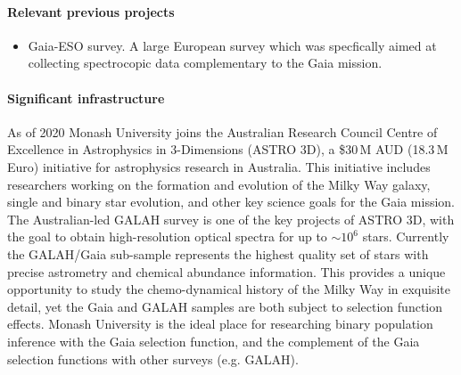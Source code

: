 \paragraph{Relevant previous projects}

\begin{itemize}
    \item Gaia-ESO survey. A large European survey which was specfically aimed at collecting spectrocopic data complementary to the Gaia mission.
\end{itemize}

\paragraph{Significant infrastructure}
As of 2020 Monash University joins the Australian Research Council Centre of Excellence in Astrophysics in 3-Dimensions (ASTRO 3D), a \$30\,M AUD (18.3\,M Euro) initiative for astrophysics research in Australia. This initiative includes researchers working on the formation and evolution of the Milky Way galaxy, single and binary star evolution, and other key science goals for the Gaia mission. The Australian-led GALAH survey is one of the key projects of ASTRO 3D, with the goal to obtain high-resolution optical spectra for up to $\sim10^6$ stars. Currently the GALAH/Gaia sub-sample represents the highest quality set of stars with precise astrometry and chemical abundance information. This provides a unique opportunity to study the chemo-dynamical history of the Milky Way in exquisite detail, yet the Gaia and GALAH samples are both subject to selection function effects. Monash University is the ideal place for researching binary population inference with the Gaia selection function, and the complement of the Gaia selection functions with other surveys (e.g. GALAH).
